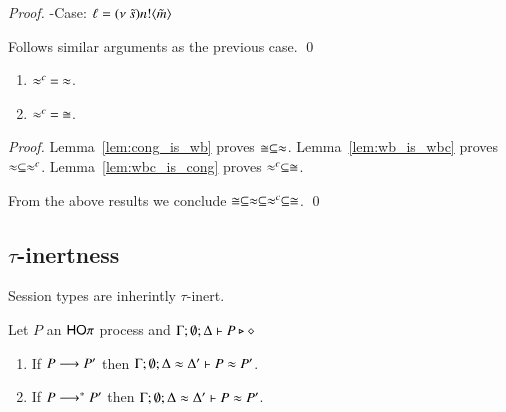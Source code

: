 \begin{proof}
	\noi -Case: $\ell = \news{\tilde{s}} \bactout{n}{\tilde{m}}$

	\noi Follows similar arguments as the previous case.
	\qed
\end{proof}


\begin{theorem}[Concidence]
	\begin{enumerate}
		\item	$\wbc\ =\ \wb$.
		\item	$\wbc\ =\ \cong$.
	\end{enumerate}
\end{theorem}

\begin{proof}
	\noi	Lemma~\ref{lem:cong_is_wb} proves $\cong \subseteq \wb$.
		Lemma~\ref{lem:wb_is_wbc} proves $\wb \subseteq \wbc$.
		Lemma~\ref{lem:wbc_is_cong} proves $\wbc \subseteq \cong$.

	\noi From the above results we conclude $\cong \subseteq \wb \subseteq \wbc \subseteq \cong$. 
	\qed
\end{proof}


\subsection{$\tau$-inertness}
\label{app:sub_tau_inert}

Session types are inherintly $\tau$-inert.

\begin{lemma}\rm
	\label{lem:tau_inert}
	Let $P$ an $\HOp$ process
	and $\Gamma; \emptyset; \Delta \proves P \hastype \Proc$
	\begin{enumerate}
		\item	If $P \red P'$ then $\horel{\Gamma}{\Delta}{P}{\wb}{\Delta'}{P'}$.
		\item	If $P \red^* P'$ then $\horel{\Gamma}{\Delta}{P}{\wb}{\Delta'}{P'}$.
	\end{enumerate}
\end{lemma}

